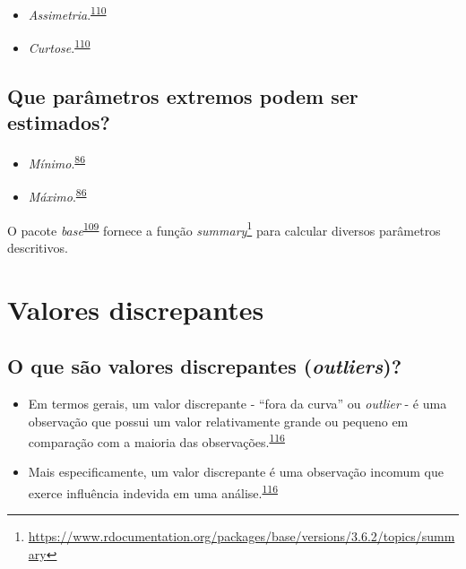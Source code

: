 \documentclass[
  a4paper,
]{book}
\renewcommand{\href}[2]{#2\footnote{\url{#1}}}
\newenvironment{infobox}[1]
  {
  \begin{itemize}
  \renewcommand{\labelitemi}{
    \raisebox{-.7\height}[0pt][0pt]{
      {\setkeys{Gin}{width=3em,keepaspectratio}
        \texttt{[image: \#1]}}
    }
  }
  \setlength{\fboxsep}{1em}
  \begin{blackbox}
  \item
  }
  {
  \end{blackbox}
  \end{itemize}
  }
\begin{document}
\begin{itemize}
\item
  \emph{Assimetria}.\textsuperscript{\protect\hyperlink{ref-kanji2006}{110}}
\item
  \emph{Curtose}.\textsuperscript{\protect\hyperlink{ref-kanji2006}{110}}
\end{itemize}

\hypertarget{que-paruxe2metros-extremos-podem-ser-estimados}{%
\subsection{Que parâmetros extremos podem ser estimados?}\label{que-paruxe2metros-extremos-podem-ser-estimados}}

\begin{itemize}
\item
  \emph{Mínimo}.\textsuperscript{\protect\hyperlink{ref-Ali2016}{86}}
\item
  \emph{Máximo}.\textsuperscript{\protect\hyperlink{ref-Ali2016}{86}}
\end{itemize}

\begin{infobox}{images/Rlogo}
O pacote \emph{base}\textsuperscript{\protect\hyperlink{ref-base-6}{109}} fornece a função \href{https://www.rdocumentation.org/packages/base/versions/3.6.2/topics/summary}{\emph{summary}} para calcular diversos parâmetros descritivos.

\end{infobox}

\hypertarget{outliers}{%
\section{Valores discrepantes}\label{outliers}}

\hypertarget{o-que-suxe3o-valores-discrepantes-outliers}{%
\subsection{\texorpdfstring{O que são valores discrepantes (\emph{outliers})?}{O que são valores discrepantes (outliers)?}}\label{o-que-suxe3o-valores-discrepantes-outliers}}

\begin{itemize}
\item
  Em termos gerais, um valor discrepante - ``fora da curva'' ou \emph{outlier} - é uma observação que possui um valor relativamente grande ou pequeno em comparação com a maioria das observações.\textsuperscript{\protect\hyperlink{ref-zuur2009}{116}}
\item
  Mais especificamente, um valor discrepante é uma observação incomum que exerce influência indevida em uma análise.\textsuperscript{\protect\hyperlink{ref-zuur2009}{116}}
\end{itemize}
\end{document}
